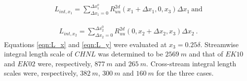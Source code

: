 \documentclass{svjour3}                     %
\begin{document}
\begin{align}
L_{int,x_1}=\sum_{\Delta x_1=0}^{\Delta x_1^{o}}R_{uu}^{2d}(x_1+\Delta x_1, 0,x_3)\Delta x_1 \ \text{and}
\label{eqn:L_x}
\end{align}

\begin{align}
L_{int,x_2}=\sum_{\Delta x_2 = 0}^{\Delta x_2^{0}}R_{uu}^{2d}(0, x_2+\Delta x_2,x_3)\Delta x_2\ .
\label{eqn:L_y}
\end{align}
Equations \ref{eqn:L_x} and \ref{eqn:L_y} were evaluated at $x_3=0.25\delta$. Streamwise integral length scale of $CHNL$ was determined  to be $2569\ m$ and that of $EK10$ and $EK02$ were, respectively, $877\ m$ and $265\ m$. Cross-stream integral length scales were, respectively, $382\ m$, $300\ m$ and $160\ m$ for the three cases.   
\end{document}
